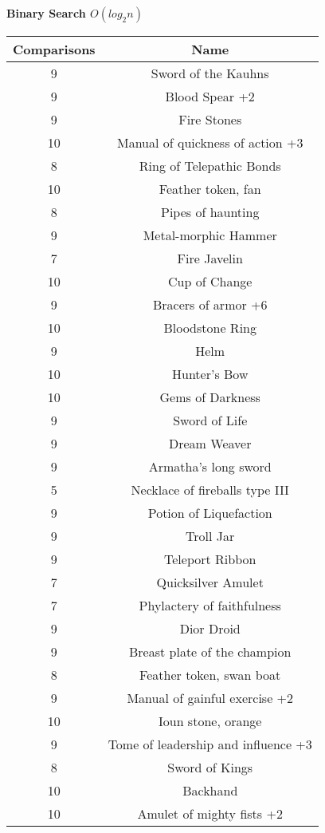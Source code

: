 \documentclass[letterpaper, 10pt]{article}
\begin{document}
\begin{center}
    \bf{Binary Search $O(log_2n)$}\\
    \begin{tabular}{|| c c ||}
    \hline
    \bf{Comparisons} & \bf{Name} \\
    \hline
    9  & Sword of the Kauhns\\
    9  & Blood Spear +2\\
    9  & Fire Stones\\
    10 & Manual of quickness of action +3\\
    8  & Ring of Telepathic Bonds\\
    10 & Feather token, fan\\
    8  & Pipes of haunting\\
    9  & Metal-morphic Hammer\\
    7  & Fire Javelin\\
    10 & Cup of Change\\
    9  & Bracers of armor +6\\
    10 & Bloodstone Ring\\
    9  & Helm\\
    10 & Hunter's Bow\\
    10 & Gems of Darkness\\
    9  & Sword of Life\\
    9  & Dream Weaver\\
    9  & Armatha's long sword\\
    5  & Necklace of fireballs type III\\
    9  & Potion of Liquefaction\\
    9  & Troll Jar\\
    9  & Teleport Ribbon\\
    7  & Quicksilver Amulet\\
    7  & Phylactery of faithfulness\\
    9  & Dior Droid\\
    9  & Breast plate of the champion\\
    8  & Feather token, swan boat\\
    9  & Manual of gainful exercise +2\\
    10 & Ioun stone, orange\\
    9  & Tome of leadership and influence +3\\
    8  & Sword of Kings\\
    10 & Backhand\\
    10 & Amulet of mighty fists +2\\

\end{tabular}
\end{center}
\end{document}
